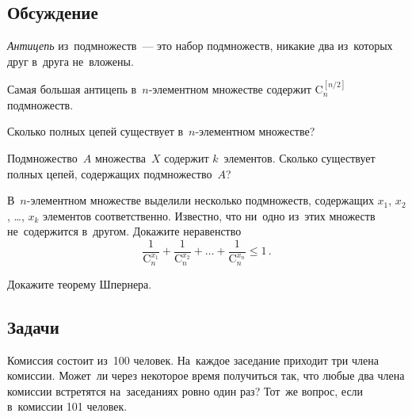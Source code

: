 


\begingroup
    \def\binom#1#2{\mathrm{C}_{#1}^{#2}}%

\subsection*{Обсуждение}

\emph{Антицепь} из~подмножеств~--- это набор подмножеств, никакие два
из~которых друг в~друга не~вложены.

Самая большая антицепь в~$n$-элементном множестве содержит
$\binom{n}{[n/2]}$ подмножеств.

\begin{exercises}

\item
Сколько полных цепей существует в~$n$-элементном множестве?

\item
Подмножество~$A$ множества~$X$ содержит $k$~элементов.
Сколько существует полных цепей, содержащих подмножество~$A$?

\item
В~$n$-элементном множестве выделили несколько подмножеств, содержащих
$x_{1}$, $x_{2}$, \ldots, $x_{k}$ элементов соответственно.
Известно, что ни~одно из~этих множеств не~содержится в~другом.
Докажите неравенство
\[
    \frac{1}{\binom{n}{x_{1}}} + \frac{1}{\binom{n}{x_{2}}}
    + \ldots +
    \frac{1}{\binom{n}{x_{n}}}
\leq
    1
\, . \]

\item
Докажите теорему Шпернера.

\end{exercises}


\subsection*{Задачи}

\begin{problems}

\item{}%
Комиссия состоит из~100 человек.
На~каждое заседание приходит три члена комиссии.
Может~ли через некоторое время получиться так, что любые два члена комиссии
встретятся на~заседаниях ровно один раз?
Тот~же вопрос, если в~комиссии 101 человек.

\end{problems}

